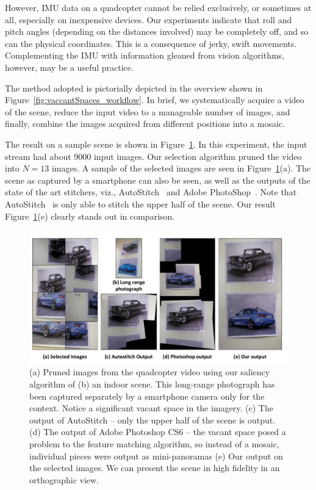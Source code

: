 However, IMU data on a quadcopter cannot be relied exclusively, or sometimes at
all, especially on inexpensive devices. Our experiments indicate that roll
and pitch angles (depending on the distances involved) may be completely off,
and so can the physical coordinates.  This is a consequence of jerky,
swift movements.  Complementing the IMU with information gleaned from
vision algorithms, however, may be a useful practice.

The method adopted is pictorially depicted in the overview shown in
Figure~\ref{fig:vaccantSpaces_workflow}.  In brief, we systematically acquire a
video of the scene, reduce the input video to a manageable number of images,
and finally, combine the images acquired from different positions into a mosaic. 

The result on a sample scene is shown in Figure~\ref{fig:vacantSpaces_result}.
In this experiment, the input stream had about 9000 input images.  Our selection algorithm
 pruned the video into $N=13$ images. A sample of the selected images are seen
 in Figure~\ref{fig:vacantSpaces_result}(a).  The scene as captured by a
 smartphone can also be seen, as well as the outputs of the state of the art
 stitchers, viz., AutoStitch~\cite{autostitch} and Adobe
 PhotoShop~\cite{photoshop}. Note that AutoStitch~\cite{autostitch} is only able
 to stitch the upper half of the scene.  Our result
 Figure~\ref{fig:vacantSpaces_result}(e) clearly stands out in comparison.\\
  
  \begin{figure}[h!]
	\centering
	\includegraphics[width=0.98\linewidth]{figures/vacantSpaces/indoor_results}
	\caption[Result: Cars]{ (a) Pruned images from the quadcopter video using our
  saliency algorithm of (b) an indoor scene. This long-range photograph
  has been captured separately by a smartphone camera only for the
  context. Notice a significant vacant space in the imagery.  (c)
  The output of AutoStitch -- only the upper half of the scene is output.
  (d) The output of Adobe Photoshop CS6 -- the vacant space posed a problem to
  the feature matching algorithm, so instead of a mosaic, individual
  pieces were output as mini-panoramas (e) Our output on the selected
  images. We can present the scene in high fidelity in an orthographic view.}	
	\label{fig:vacantSpaces_result}
	\end{figure}
  
